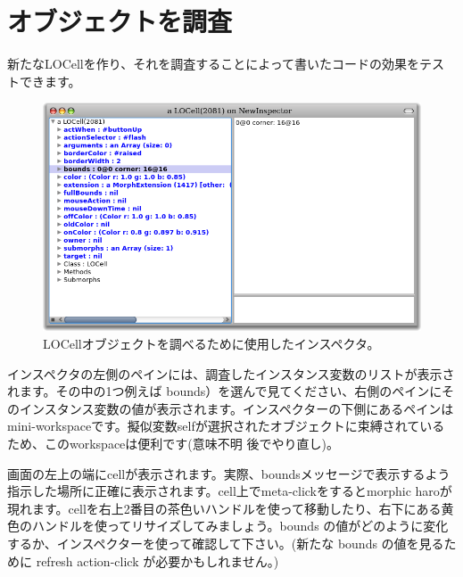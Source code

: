 \documentclass[a4paper,10pt,twoside]{book}
\begin{document}
\section{オブジェクトを調査}

新たなLOCellを作り、それを調査することによって書いたコードの効果をテストできます。


\begin{figure}[htbp]
   \centering
   \includegraphics[width=\textwidth]{LOCellInspector} 
   \caption{LOCellオブジェクトを調べるために使用したインスペクタ。}
\end{figure}

インスペクタの左側のペインには、調査したインスタンス変数のリストが表示されます。その中の1つ例えば bounds）を選んで見てください、右側のペインにそのインスタンス変数の値が表示されます。インスペクターの下側にあるペインはmini-workspaceです。擬似変数selfが選択されたオブジェクトに束縛されているため、このworkspaceは便利です(意味不明 後でやり直し)。

画面の左上の端にcellが表示されます。実際、boundsメッセージで表示するよう指示した場所に正確に表示されます。cell上でmeta-clickをするとmorphic haroが現れます。cellを右上2番目の茶色いハンドルを使って移動したり、右下にある黄色のハンドルを使ってリサイズしてみましょう。bounds の値がどのように変化するか、インスペクターを使って確認して下さい。(新たな bounds の値を見るために refresh action-click が必要かもしれません。)
\end{document}
